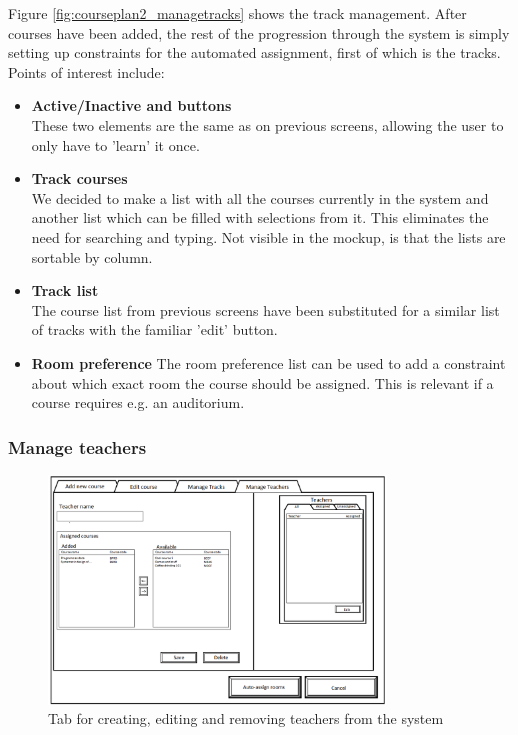 Figure \ref{fig:courseplan2_managetracks} shows the track management. After courses have been added, the rest of the progression through the system is simply setting up constraints for the automated assignment, first of which is the tracks. 
Points of interest include:
\begin{itemize}
\item \textbf{Active/Inactive and buttons} \\
These two elements are the same as on previous screens, allowing the user to only have to 'learn' it once.
\item \textbf{Track courses} \\
We decided to make a list with all the courses currently in the system and another list which can be filled with selections from it. This eliminates the need for searching and typing. Not visible in the mockup, is that the lists are sortable by column.
\item \textbf{Track list} \\
The course list from previous screens have been substituted for a similar list of tracks with the familiar 'edit' button.
\item \textbf{Room preference}
The room preference list can be used to add a constraint about which exact room the course should be assigned. This is relevant if a course requires e.g. an auditorium.
\end{itemize}

\subsubsection{Manage teachers}
\begin{figure}[htb]
\begin{center}
\leavevmode
\includegraphics[width=0.8\textwidth]{images/courseplan2_manageteachers}
\end{center}
\caption{Tab for creating, editing and removing teachers from the system}
\label{fig:courseplan2_manageteachers}
\end{figure}


